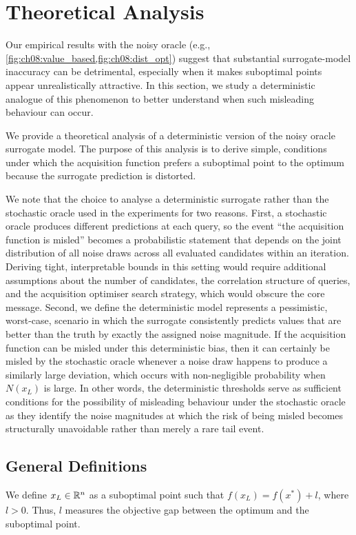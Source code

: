 \section{Theoretical Analysis}
\label{sec:ch08:theoretical-analysis}
Our empirical results with the noisy oracle (e.g., \cref{fig:ch08:value_based,fig:ch08:dist_opt}) suggest that substantial surrogate-model inaccuracy can be detrimental, especially when it makes suboptimal points appear unrealistically attractive. In this section, we study a deterministic analogue of this phenomenon to better understand when such misleading behaviour can occur.

We provide a theoretical analysis of a deterministic version of the noisy oracle surrogate model. The purpose of this analysis is to derive simple, conditions under which the acquisition function prefers a suboptimal point to the optimum because the surrogate prediction is distorted.

We note that the choice to analyse a deterministic surrogate rather than the stochastic oracle used in the experiments for two reasons. First, a stochastic oracle produces different predictions at each query, so the event ``the acquisition function is misled'' becomes a probabilistic statement that depends on the joint distribution of all noise draws across all evaluated candidates within an iteration. Deriving tight, interpretable bounds in this setting would require additional assumptions about the number of candidates, the correlation structure of queries, and the acquisition optimiser search strategy, which would obscure the core message. Second, we define the deterministic model represents a pessimistic, worst-case, scenario in which the surrogate consistently predicts values that are better than the truth by exactly the assigned noise magnitude. If the acquisition function can be misled under this deterministic bias, then it can certainly be misled by the stochastic oracle whenever a noise draw happens to produce a similarly large deviation, which occurs with non-negligible probability when $N(x_L)$ is large. In other words, the deterministic thresholds serve as sufficient conditions for the possibility of misleading behaviour under the stochastic oracle as they identify the noise magnitudes at which the risk of being misled becomes structurally unavoidable rather than merely a rare tail event.
\subsection{General Definitions}
\label{sec:ch08:gen_defs}
We define $x_L\in \mathbb{R}^n$ as a suboptimal point such that $f(x_L) = f(x^*) + l$, where $l > 0$. Thus, $l$ measures the objective gap between the optimum and the suboptimal point.


